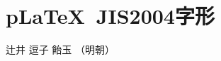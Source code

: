\documentclass{jsarticle}
\begin{document}
\section{p\LaTeX~JIS2004字形}

辻井 逗子 飴玉 （明朝）

\end{document}
